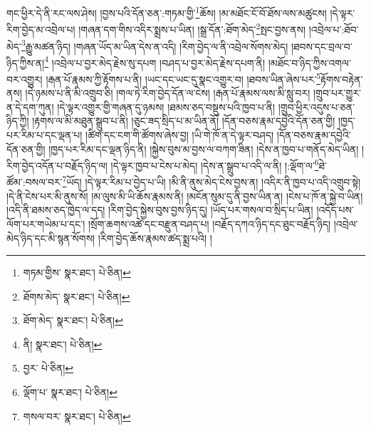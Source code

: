 གང་ཕྱིར་དེ་ནི་རང་ལས་ཤེས། །བྱས་པའི་དོན་ཅན་:གཏམ་གྱི་\footnote{གཏམ་གྱིས་  སྣར་ཐང་།  པེ་ཅིན། }ཆོས། །མ་མཐོང་ངོ་བོ་ཐོས་ལས་མཚུངས། །དེ་ལྟར་རིག་བྱེད་མ་འབྲེལ་པ། །གཞན་དག་གིས་འདིར་སྨྲས་པ་ཡིན། །སྒྲ་དོན་:ཐོག་མེད་\footnote{ཐོགས་མེད་  སྣར་ཐང་།  པེ་ཅིན། }སྤང་བྱས་ནས། །འབྲེལ་པ་:ཐོབ་མེད་\footnote{ཐོག་མེད་  སྣར་ཐང་།  པེ་ཅིན། }རྒྱུ་མཚན་ཉིད། །གཞན་ཡོད་མ་ཡིན་དེས་ན་འདི། །རིག་བྱེད་ལ་ནི་འབྲེལ་སོགས་མེད། །ཐབས་དང་བྲལ་བ་ཉིད་ཀྱིས་ན།\footnote{ནི།  སྣར་ཐང་།  པེ་ཅིན། } །འབྲེལ་པ་བྱར་མེད་རྗེས་སུ་དཔག །བཤད་པ་བྱར་མེད་རྗེས་དཔག་ནི། །མཐོང་བ་ཉིད་ཀྱིས་འགལ་བར་འགྱུར། །རྒན་པོ་རྣམས་ཀྱི་རྟོགས་པ་ནི། །ཡང་དང་ཡང་དུ་སྣང་འགྱུར་བ། །ཐབས་ཡིན་ཞེས་པར་\footnote{བྱར་  པེ་ཅིན། }རྟོགས་བརྟེན་ནས། །དེ་ཉམས་པ་ནི་མི་འགྲུབ་ཅི། །གལ་ཏེ་རིག་བྱེད་དོན་ལ་ངེས། །རྒན་པོ་རྣམས་ལས་མི་སླུ་བར། །གྲུབ་པར་གྱུར་ན་དེ་དག་ཀུན། །དེ་ལྟར་འགྱུར་གྱི་གཞན་དུ་ཉམས། །ཐམས་ཅད་བསྡུས་པའི་ཁྱབ་པ་ནི། །གྲུབ་ཕྱིར་འདུས་པ་ཅན་ཉིད་ཀྱི། །རྟགས་ལ་མི་མཐུན་སྒྲུབ་པ་ནི། །ཅུང་ཟད་སྲིད་པ་མ་ཡིན་ནོ། །དོན་བཅས་རྣམ་དབྱེའི་དོན་ཅན་གྱི། །ཁྱད་པར་རིམ་པ་དང་ལྡན་པ། །ཚིག་དང་ངག་གི་ཚོགས་ཞེས་བྱ། །ཡི་གེ་ཁོ་ན་དེ་ལྟར་བཤད། །དོན་བཅས་རྣམ་དབྱེའི་དོན་ཅན་གྱི། །ཁྱད་པར་རིམ་དང་ལྡན་ཉིད་ནི། །སྐྱེས་བུས་མ་བྱས་ལ་བཀག་ཟིན། །དེས་ན་ཁྱབ་པ་གནོད་མེད་ཡིན། །རིག་བྱེད་འདོན་པ་བརྗོད་ཉིད་ལ། །དེ་ལྟར་ཁྱབ་པ་ངེས་པ་མེད། །དེས་ན་སྒྲུབ་པ་འདི་ལ་ནི། །:ལྡོག་ལ་\footnote{ལྡོག་པ་  སྣར་ཐང་།  པེ་ཅིན། }ཐེ་ཚོམ་:བསལ་བར་\footnote{གསལ་བར་  སྣར་ཐང་།  པེ་ཅིན། }ཡོད། །དེ་ལྟར་རིམ་པ་བྱེད་པ་ཡི། །མི་ནི་ནུས་མེད་ངེས་བྱས་ན། །འདིར་ནི་ཁྱབ་པ་འདི་འགྲུབ་སྟེ། །དེ་ནི་ངེས་པར་མི་ནུས་སོ། །མ་ལུས་མི་ཡི་ཆོས་རྣམས་ནི། །མངོན་སུམ་དུ་ནི་བྱས་ཡིན་ན། །ངེས་པ་ཁོ་ན་སྐྱེ་བ་ཡིན། །འདི་ནི་ཐམས་ཅད་ཁྱེད་ལ་དད། །རིག་བྱེད་སྐྱེས་བུས་བྱས་ཉིད་དུ། །ཡོད་པར་གསལ་བ་སྲིད་པ་ཡིན། །འདོད་པས་ལོག་པར་གཡེམ་པ་དང་། །སྲོག་ཆགས་འཚེ་དང་བརྫུན་བཤད་པ། །བརྗོད་དཀའ་ཉིད་དང་ཐུང་བརྗོད་ཉིད། །འབྲེལ་མེད་ཉིད་དང་མི་སྙན་སོགས། །རིག་བྱེད་ཆོས་རྣམས་ཚད་སྨྲ་པའི། །
